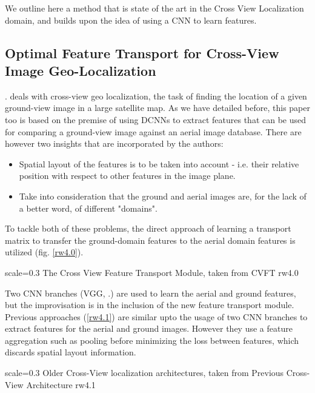 We outline here a method that is state of the art in the Cross View Localization domain, and builds upon the idea of using a CNN to learn features. 

\subsection{Optimal Feature Transport for Cross-View Image Geo-Localization}
\cite{Shi2019}. deals with cross-view geo localization, the task of finding the location of a given ground-view image in a large satellite map. As we have detailed before, this paper too is based on the premise of using DCNNs to extract features that can be used for comparing a ground-view image against an aerial image database. There are however two insights that are incorporated by the authors:

\begin{itemize}
	\item Spatial layout of the features is to be taken into account - i.e. their relative position with respect to other features in the image plane. 
	
	\item Take into consideration that the ground and aerial images are, for the lack of a better word, of different "domains". 
\end{itemize}

To tackle both of these problems, the direct approach of learning a transport matrix to transfer the ground-domain features to the aerial domain features is utilized (fig. \ref{rw4.0}). 

{scale=0.3}%
{The Cross View Feature Transport Module, taken from \cite{Shi2019}}%
{CVFT}%
{rw4.0} %

Two CNN branches (VGG, \cite{Simonyan2015}.) are used to learn the aerial and ground features, but the improvisation is in the inclusion of the new feature transport module. Previous approaches (\ref{rw4.1}) are similar upto the usage of two CNN branches to extract features for the aerial and ground images. However they use a feature aggregation such as pooling before minimizing the loss between features, which discards spatial layout information.

{scale=0.3}%
{Older Cross-View localization architectures, taken from \cite{Shi2019}}%
{Previous Cross-View Architecture}%
{rw4.1} %

